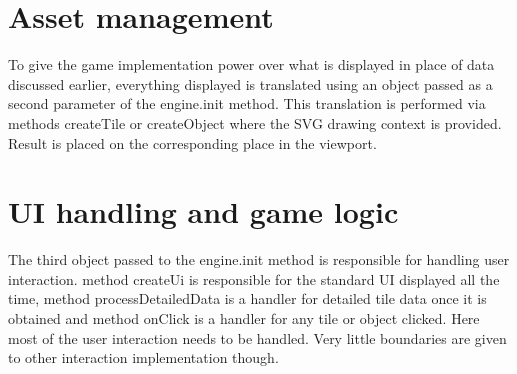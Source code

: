 \documentclass[11pt,oneside, final]{fithesis2}
\begin{document}
\section{Asset management}
To give the game implementation power over what is displayed in place of data discussed earlier, everything displayed is translated using an object passed as a second parameter of the engine.init method. This translation is performed via methods createTile or createObject where the SVG drawing context is provided. Result is placed on the corresponding place in the viewport.

\section{UI handling and game logic}
The third object passed to the engine.init method is responsible for handling user interaction. method createUi is responsible for the standard UI displayed all the time, method processDetailedData is a handler for detailed tile data once it is obtained and method onClick is a handler for any tile or object clicked. Here most of the user interaction needs to be handled. Very little boundaries are given to other interaction implementation though.
\end{document}
